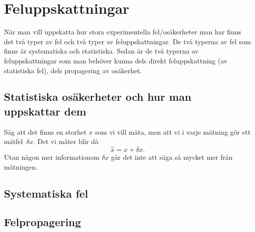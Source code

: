 \documentclass[11pt,a4paper, english, swedish
]{article}
\begin{document}
\section{Feluppskattningar}\label{sec:feluppskattningar}
När man vill uppskatta hur stora experimentella fel/osäkerheter man
har finns det två typer av fel och två typer av feluppskattningar. De
två typerna av fel som finns är systematiska och statistiska. Sedan är
de två typerna av feluppskattningar som man behöver kunna dels direkt
feluppskattning (av statistiska fel), dels propagering av osäkerhet. 


\subsection{Statistiska osäkerheter och hur man uppskattar dem}
Säg att det finns en storhet $x$ som vi vill mäta, men att vi i varje
mätning gör ett mätfel~$\delta{x}$. Det vi mäter blir då
\begin{equation}
\hat{x}=x+\delta{x}.
\end{equation}
Utan någon mer informationom $\delta{x}$ går det inte att säga så mycket mer
från mätningen.

\subsection{Systematiska fel}

\subsection{Felpropagering}



%
\end{document}
